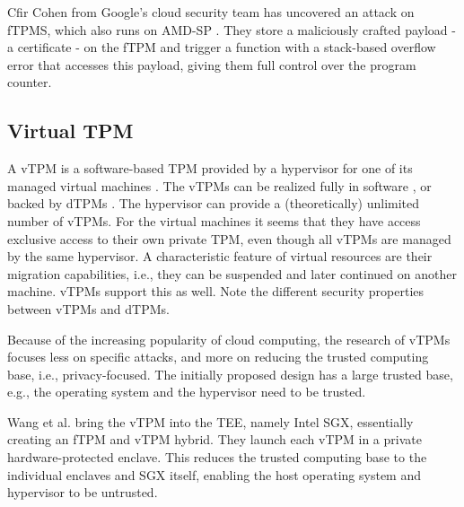 Cfir Cohen from Google's cloud security team has uncovered an attack on fTPMS, which also runs on AMD-SP \cite{cohen}. They store a maliciously crafted payload - a certificate - on the fTPM and trigger a function with a stack-based overflow error that accesses this payload, giving them full control over the program counter.



\subsection{Virtual TPM}

A vTPM is a software-based TPM provided by a hypervisor for one of its managed virtual machines \cite{268868}. The vTPMs can be realized fully in software \cite{268868}, or backed by dTPMs \cite{Liu2010}. The hypervisor can provide a (theoretically) unlimited number of vTPMs. For the virtual machines it seems that they have access exclusive access to their own private TPM, even though all vTPMs are managed by the same hypervisor. A characteristic feature of virtual resources are their migration capabilities, i.e., they can be suspended and later continued on another machine. vTPMs support this as well. Note the different security properties between vTPMs and dTPMs.

Because of the increasing popularity of cloud computing, the research of vTPMs focuses less on specific attacks, and more on reducing the trusted computing base, i.e., privacy-focused. The initially proposed design \cite{268868} has a large trusted base, e.g., the operating system and the hypervisor need to be trusted.

Wang et al. \cite{Wang2019} bring the vTPM into the \ac{TEE}, namely Intel SGX, essentially creating an fTPM and vTPM hybrid. They launch each vTPM in a private hardware-protected enclave. This reduces the trusted computing base to the individual enclaves and SGX itself, enabling the host operating system and hypervisor to be untrusted.

